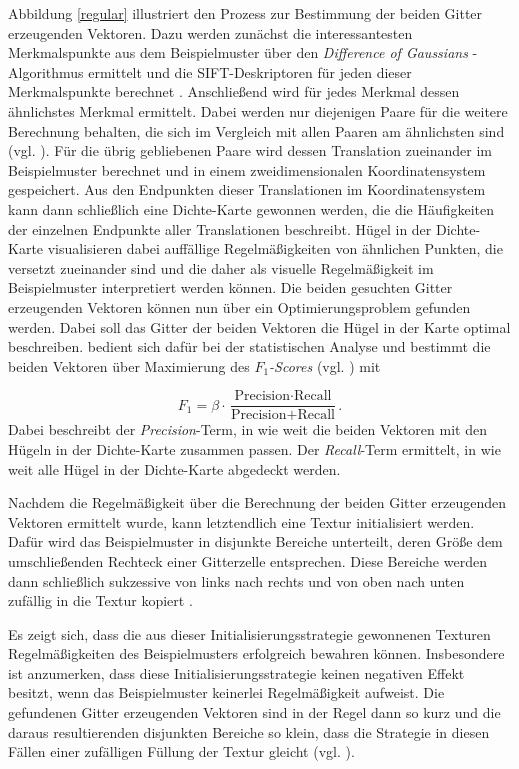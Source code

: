 Abbildung \ref{regular} illustriert den Prozess zur Bestimmung der beiden Gitter erzeugenden Vektoren.
Dazu werden zunächst die interessantesten Merkmalspunkte aus dem Beispielmuster über den \emph{\glqq Difference of Gaussians\grqq} -Algorithmus ermittelt und die SIFT-Deskriptoren für jeden dieser Merkmalspunkte berechnet \cite{SelfTuning}.
Anschließend wird für jedes Merkmal dessen ähnlichstes Merkmal ermittelt.
Dabei werden nur diejenigen Paare für die weitere Berechnung behalten, die sich im Vergleich mit allen Paaren am ähnlichsten sind (vgl. \cite{SelfTuning}).
Für die übrig gebliebenen Paare wird dessen Translation zueinander im Beispielmuster berechnet und in einem zweidimensionalen Koordinatensystem gespeichert.
Aus den Endpunkten dieser Translationen im Koordinatensystem kann dann schließlich eine Dichte-Karte gewonnen werden, die die Häufigkeiten der einzelnen Endpunkte aller Translationen beschreibt.
Hügel in der Dichte-Karte visualisieren dabei auffällige Regelmäßigkeiten von ähnlichen Punkten, die versetzt zueinander sind und die daher als visuelle Regelmäßigkeit im Beispielmuster interpretiert werden können.
Die beiden gesuchten Gitter erzeugenden Vektoren können nun über ein Optimierungsproblem gefunden werden.
Dabei soll das Gitter der beiden Vektoren die Hügel in der Karte optimal beschreiben.
\cite{SelfTuning} bedient sich dafür bei der statistischen Analyse und bestimmt die beiden Vektoren über Maximierung des \emph{\glqq $F_1$-Scores\grqq} (vgl. \cite{F1Score, SelfTuning}) mit

\begin{equation*}
	F_1 = \beta \cdot \frac{\text{Precision} \cdot \text{Recall}}{\text{Precision} + \text{Recall}}\text{.}
\end{equation*}
Dabei beschreibt der \emph{Precision}-Term, in wie weit die beiden Vektoren mit den Hügeln in der Dichte-Karte zusammen passen.
Der \emph{Recall}-Term ermittelt, in wie weit alle Hügel in der Dichte-Karte abgedeckt werden.

Nachdem die Regelmäßigkeit über die Berechnung der beiden Gitter erzeugenden Vektoren ermittelt wurde, kann letztendlich eine Textur initialisiert werden.
Dafür wird das Beispielmuster in disjunkte Bereiche unterteilt, deren Größe dem umschließenden Rechteck einer Gitterzelle entsprechen.
Diese Bereiche werden dann schließlich sukzessive von links nach rechts und von oben nach unten zufällig in die Textur kopiert \cite{SelfTuning}.

Es zeigt sich, dass die aus dieser Initialisierungsstrategie gewonnenen Texturen Regelmäßigkeiten des Beispielmusters erfolgreich bewahren können.
Insbesondere ist anzumerken, dass diese Initialisierungsstrategie keinen negativen Effekt besitzt, wenn das Beispielmuster keinerlei Regelmäßigkeit aufweist.
Die gefundenen Gitter erzeugenden Vektoren sind in der Regel dann so kurz und die daraus resultierenden disjunkten Bereiche so klein, dass die Strategie in diesen Fällen einer zufälligen Füllung der Textur gleicht (vgl. \cite{SelfTuning}).


